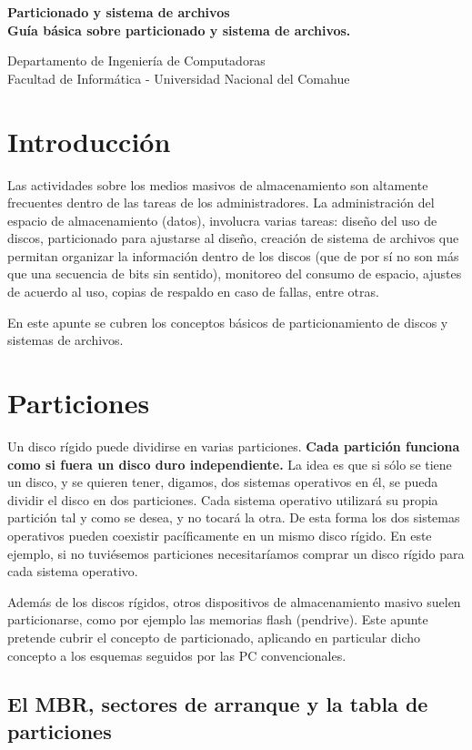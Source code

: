 \documentclass[12pt]{article}
\def\maketitle{

 \makeatletter
 {\color{bl} \centering \huge \sc \textbf{
 Particionado y sistema de archivos \\ 
\large \vspace*{-8pt} \color{black} Guía básica sobre particionado y sistema de archivos.
 \vspace*{8pt} }\par}
 \makeatother


 \makeatletter
 {\centering \small 
 	Departamento de Ingeniería de Computadoras \\
 	Facultad de Informática - Universidad Nacional del Comahue \\
 	\vspace{20pt} }
 \makeatother

}
\begin{document}
\thispagestyle{empty}
\maketitle
\setlength{\parindent}{0pt}

\section*{Introducción}

Las actividades sobre los medios masivos de almacenamiento son altamente 
frecuentes dentro de las tareas de los administradores. La administración 
del espacio de almacenamiento (datos), involucra varias tareas: diseño 
del uso de discos, particionado para ajustarse al diseño, creación de 
sistema de archivos que permitan organizar la información dentro de los
discos (que de por sí no son más que una secuencia de bits sin sentido),
monitoreo del consumo de espacio, ajustes de acuerdo al uso, copias de 
respaldo en caso de fallas, entre otras. 

En este apunte se cubren los conceptos básicos de particionamiento de 
discos y sistemas de archivos.  

\section*{Particiones}

Un disco rígido puede dividirse en varias particiones. {\bf Cada partición 
funciona como si fuera un disco duro independiente.} 
La idea es que si sólo se tiene un disco, y se quieren tener, digamos,
 dos sistemas operativos en él, se pueda dividir 
el disco en dos particiones. Cada sistema operativo utilizará su propia 
partición tal y como se desea, y no tocará 
la otra. De esta forma los dos sistemas operativos pueden coexistir 
pacíficamente en un mismo disco rígido. En este ejemplo, si no tuviésemos
particiones necesitaríamos comprar un disco rígido para cada sistema 
operativo.

Además de los discos rígidos, otros dispositivos de almacenamiento 
masivo suelen particionarse, como por ejemplo las memorias flash (pendrive).
Este apunte pretende cubrir el concepto de particionado, aplicando en 
particular dicho concepto a los esquemas seguidos por las PC convencionales.  


\subsection*{El MBR, sectores de arranque y la tabla de particiones}
\end{document}
